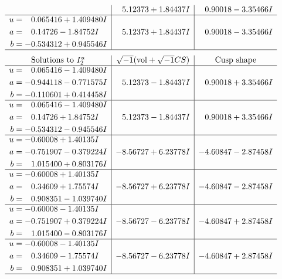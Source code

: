 \documentclass[1p]{elsarticle_modified}
\theoremstyle{definition}
\newcommand{\I}{\sqrt{-1}}
\begin{document}
$$\begin{array}{c|c|c}
 & \phantom{-}5.12373 + 1.84437 I & \phantom{-}0.90018 - 3.35466 I \\ \hline\begin{aligned}
u &= \phantom{-}0.065416 + 1.409480 I \\
a &= \phantom{-}0.14726 - 1.84752 I \\
b &= -0.534312 + 0.945546 I\end{aligned}
 & \phantom{-}5.12373 + 1.84437 I & \phantom{-}0.90018 - 3.35466 I\\
 \hline 
 \end{array}$$\newpage$$\begin{array}{c|c|c}  
\text{Solutions to }I^u_{2}& \I (\text{vol} + \sqrt{-1}CS) & \text{Cusp shape}\\
 \hline 
\begin{aligned}
u &= \phantom{-}0.065416 - 1.409480 I \\
a &= -0.944118 - 0.771575 I \\
b &= -0.110601 + 0.414458 I\end{aligned}
 & \phantom{-}5.12373 - 1.84437 I & \phantom{-}0.90018 + 3.35466 I \\ \hline\begin{aligned}
u &= \phantom{-}0.065416 - 1.409480 I \\
a &= \phantom{-}0.14726 + 1.84752 I \\
b &= -0.534312 - 0.945546 I\end{aligned}
 & \phantom{-}5.12373 - 1.84437 I & \phantom{-}0.90018 + 3.35466 I \\ \hline\begin{aligned}
u &= -0.60008 + 1.40135 I \\
a &= -0.751907 - 0.379224 I \\
b &= \phantom{-}1.015400 + 0.803176 I\end{aligned}
 & -8.56727 + 6.23778 I & -4.60847 - 2.87458 I \\ \hline\begin{aligned}
u &= -0.60008 + 1.40135 I \\
a &= \phantom{-}0.34609 + 1.75574 I \\
b &= \phantom{-}0.908351 - 1.039740 I\end{aligned}
 & -8.56727 + 6.23778 I & -4.60847 - 2.87458 I \\ \hline\begin{aligned}
u &= -0.60008 - 1.40135 I \\
a &= -0.751907 + 0.379224 I \\
b &= \phantom{-}1.015400 - 0.803176 I\end{aligned}
 & -8.56727 - 6.23778 I & -4.60847 + 2.87458 I \\ \hline\begin{aligned}
u &= -0.60008 - 1.40135 I \\
a &= \phantom{-}0.34609 - 1.75574 I \\
b &= \phantom{-}0.908351 + 1.039740 I\end{aligned}
 & -8.56727 - 6.23778 I & -4.60847 + 2.87458 I\\
 \hline 
 \end{array}$$\newpage\newpage\renewcommand{\arraystretch}{1}
\end{document}
